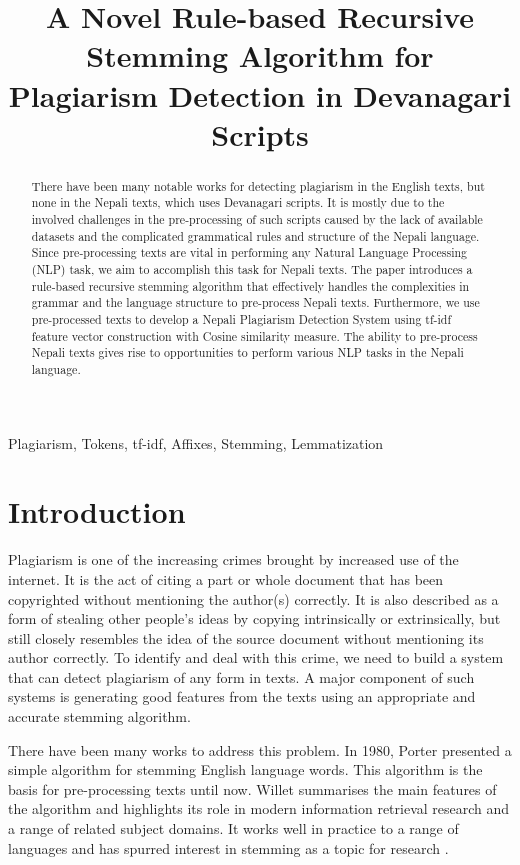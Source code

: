 \documentclass[conference]{IEEEtran}
\title{A Novel Rule-based Recursive Stemming Algorithm for
  Plagiarism Detection in Devanagari Scripts\\
}
\author{\IEEEauthorblockN{Ayush Kumar Shah}
  \IEEEauthorblockA{\textit{Department of Computing and Information Sciences} \\
  \textit{Rochester Institute of Technology} \\
Rochester, NY 14623, USA \\
as1211@rit.edu
}}
\begin{document}
\maketitle

\begin{abstract}
There have been many notable works for detecting plagiarism in the English
texts, but none in the Nepali texts, which uses Devanagari scripts. It is mostly
due to the
involved challenges in the pre-processing of such scripts caused by the lack of
available datasets and the complicated
grammatical rules and structure of the Nepali language. Since
pre-processing texts are vital in performing any Natural Language Processing
(NLP) task, we aim to accomplish this task for Nepali texts. The paper
introduces a rule-based recursive stemming algorithm that effectively handles the
complexities in grammar and the language structure to pre-process Nepali texts.
Furthermore, we use pre-processed texts to develop
a Nepali Plagiarism Detection System using tf-idf feature vector construction
with Cosine similarity measure. The ability to pre-process Nepali texts gives
rise to opportunities to perform various NLP tasks in the Nepali language.
\end{abstract}

\begin{IEEEkeywords}
Plagiarism, Tokens, tf-idf, Affixes, Stemming, Lemmatization
\end{IEEEkeywords}

\section{Introduction}
Plagiarism is one of the increasing crimes brought by increased use of the
internet. It is the act of citing a part or whole document that has been copyrighted without mentioning the author(s) correctly. It is also described as a form of stealing other people's ideas by copying intrinsically
or extrinsically, but still closely resembles the idea of the source document without mentioning its author correctly\cite{r1}. To identify
and deal with this crime, we need to build a system that can detect
plagiarism of any form in texts. A major component of such systems is generating good features from the texts using an appropriate and accurate
stemming algorithm.

There have been many works to address this problem. In 1980, Porter presented a simple algorithm for stemming English language words. This algorithm is the basis
for pre-processing texts until now. Willet \cite{r2} summarises the main features of
the algorithm and highlights its role in modern information retrieval research
and a range of related subject domains. It works well in practice to a
range of languages and has spurred interest in stemming as a topic for research \cite{r2}.  
\end{document}
